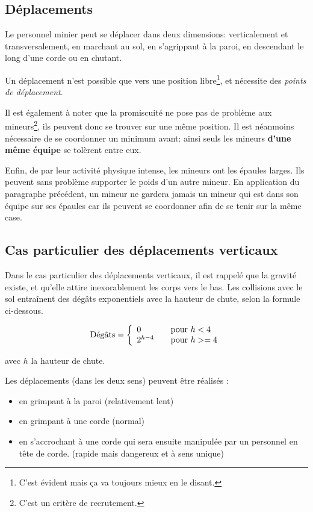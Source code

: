 \subsection{Déplacements}

  Le personnel minier peut se déplacer dans deux dimensions: verticalement et
  transversalement, en marchant au sol, en s'agrippant à la paroi, en
  descendant le long d'une corde ou en chutant.

  Un déplacement n'est possible que vers une position libre\footnote{C'est
  évident mais ça va toujours mieux en le disant.}, et nécessite des
  \textit{points de déplacement}.

  Il est également à noter que la promiscuité ne pose pas de problème aux
  mineurs\footnote{C'est un critère de recrutement.}, ils peuvent donc se
  trouver sur une même position. Il est néanmoins nécessaire de se coordonner
  un minimum avant: ainsi seuls les mineurs \textbf{d'une même équipe} se
  tolèrent entre eux.

  Enfin, de par leur activité physique intense, les mineurs ont les épaules
  larges. Ils peuvent sans problème supporter le poids d'un autre mineur. En
  application du paragraphe précédent, un mineur ne gardera jamais un mineur
  qui est dans son équipe sur ses épaules car ils peuvent se coordonner afin de
  se tenir sur la même case.

\subsection{Cas particulier des déplacements verticaux}

  Dans le cas particulier des déplacements verticaux, il est rappelé que la
  gravité existe, et qu'elle attire inexorablement les corps vers le bas. Les
  collisions avec le sol entraînent des dégâts exponentiels avec la hauteur de
  chute, selon la formule ci-dessous.

  \[
    \text{Dégâts} = 
    \left\{
      \begin{array}{l l}
        0         & \quad \text{pour $h < 4$}  \\
        2^{h-4} & \quad \text{pour $h >= 4$} \\
      \end{array}
    \right.
  \]

  avec $h$ la hauteur de chute.

  Les déplacements (dans les deux sens) peuvent être réalisés :

  \begin{itemize}
    \item en grimpant à la paroi (relativement lent)
    \item en grimpant à une corde (normal)
    \item en s'accrochant à une corde qui sera ensuite manipulée par un
      personnel en tête de corde. (rapide mais dangereux et à sens unique)
  \end{itemize}


